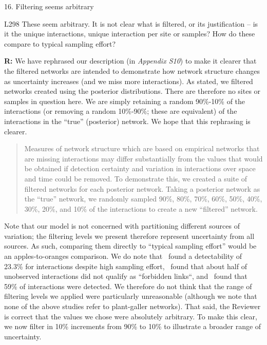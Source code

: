 \documentclass[12pt]{letter}
\newenvironment{refquote}{\bigskip \begin{it}}{\end{it}\smallskip}
\begin{document}
	16. Filtering seems arbitrary 

		\begin{refquote}
		L298 These seem arbitrary. It is not clear what is filtered, or its justification – is it the unique interactions, unique interaction per site or samples? How do these compare to typical sampling effort?
		\end{refquote}


		\textbf{R:} We have rephrased our description (in \emph{Appendix S10}) to make it clearer that the filtered networks are intended to demonstrate how network structure changes as uncertainty increases (and we miss more interactions). As stated, we filtered networks created using the posterior distributions. There are therefore no sites or samples in question here. We are simply retaining a random 90\%-10\% of the interactions (or removing a random 10\%-90\%; these are equivalent) of the interactions in the ``true'' (posterior) network. We hope that this rephrasing is clearer. 


			\begin{quotation}
				Measures of network structure which are based on empirical networks that are missing interactions may differ substantially from the values that would be obtained if detection certainty and variation in interactions over space and time could be removed. To demonstrate this, we created a suite of filtered networks for each posterior network. Taking a posterior network as the ``true'' network, we randomly sampled 90\%, 80\%, 70\%, 60\%, 50\%, 40\%, 30\%, 20\%, and 10\% of the interactions to create a new ``filtered'' network.
			\end{quotation}


		Note that our model is not concerned with partitioning different sources of variation; the filtering levels we present therefore represent uncertainty from all sources. As such, comparing them directly to ``typical sampling effort'' would be an apples-to-oranges comparison. We do note that~\citet{Weinstein2017a} found a detectability of 23.3\% for interactions despite high sampling effort,~\citet{Jordano2016} found that about half of unobserved interactions did not qualify as ``forbidden links``, and~\citet{Bartomeus2013} found that 59\% of interactions were detected. We therefore do not think that the range of filtering levels we applied were particularly unreasonable (although we note that none of the above studies refer to plant-galler networks). That said, the Reviewer is correct that the values we chose were absolutely arbitrary. To make this clear, we now filter in 10\% increments from 90\% to 10\% to illustrate a broader range of uncertainty.
\end{document}
